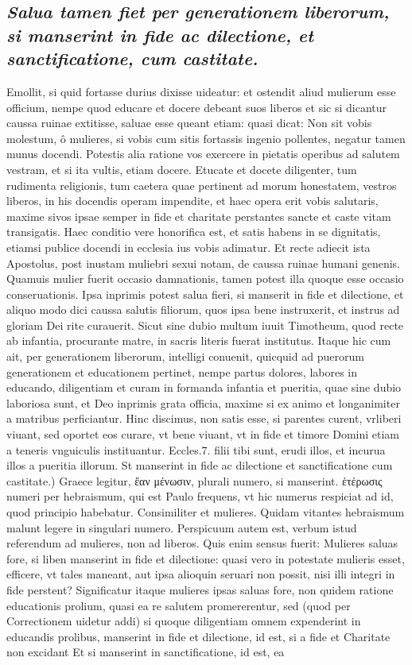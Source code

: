 \documentclass{article}
\begin{document}
\begin{pages}
\subsection*{\textit{Salua tamen fiet per generationem liberorum, si manserint in fide ac dilectione, et sanctificatione, cum castitate. }}\pstart Emollit, si quid fortasse durius dixisse uideatur: et ostendit aliud mulierum esse officium, nempe quod educare et docere debeant suos liberos et sic si dicantur caussa ruinae extitisse, saluae esse queant etiam: quasi dicat: Non sit vobis molestum, ô mulieres, si vobis cum sitis fortassis ingenio pollentes, negatur tamen munus docendi. Potestis alia ratione vos exercere in pietatis operibus ad salutem vestram, et si ita vultis, etiam docere. Etucate et docete diligenter, tum rudimenta religionis, tum caetera quae pertinent ad morum honestatem, vestros liberos, in his docendis operam impendite, et haec opera erit vobis salutaris, maxime sivos ipsae semper in fide et charitate perstantes sancte et caste vitam transigatis. Haec conditio vere honorifica est, et satis habens in se dignitatis, etiamsi publice docendi in ecclesia ius vobis adimatur. Et recte adiecit ista Apostolus, post inustam muliebri sexui notam, de caussa ruinae humani genenis. Quamuis mulier fuerit occasio damnationis, tamen potest illa quoque  esse occasio conseruationis. Ipsa inprimis potest salua fieri, si manserit in fide et dilectione, et aliquo modo dici caussa salutis filiorum, quos ipsa bene instruxerit, et instrus ad gloriam Dei rite curauerit. Sicut sine dubio multum iuuit Timotheum, quod recte ab infantia, procurante matre, in sacris literis fuerat institutus. Itaque hic cum ait, per generationem liberorum, intelligi conuenit, quicquid ad puerorum generationem et educationem pertinet, nempe partus dolores, labores in educando, diligentiam et curam in formanda infantia et pueritia, quae sine dubio laboriosa sunt, et Deo inprimis grata officia, maxime si ex animo et longanimiter a matribus perficiantur. Hinc discimus, non satis esse, si parentes curent, vrliberi viuant, sed oportet eos curare, vt bene viuant, vt in fide et timore Domini etiam a teneris vnguiculis instituantur. Eccles.7. filii tibi sunt, erudi illos, et incurua illos a pueritia illorum.  \pend\pstart St manserint in fide ac dilectione et sanctificatione cum castitate.) Graece legitur, ἔαν μένωσιν, plurali numero, si manserint. ἑτέρωσις numeri per hebraismum, qui est Paulo frequens, vt hic numerus respiciat ad id, quod principio habebatur. Consimiliter et mulieres. Quidam vitantes hebraismum malunt legere in singulari numero. Perspicuum autem est, verbum istud referendum ad mulieres, non ad liberos. Quis enim sensus fuerit: Mulieres saluas fore, si liben manserint in fide et dilectione: quasi vero in potestate mulieris esset, efficere, vt tales maneant, aut ipsa alioquin seruari non possit, nisi illi integri in fide perstent? Significatur itaque mulieres ipsas saluas fore, non quidem ratione educationis prolium, quasi ea re salutem promererentur, sed (quod per Correctionem uidetur addi) si quoque  diligentiam omnem expenderint in educandis prolibus, manserint in fide et dilectione, id est, si a fide et Charitate non excidant Et si manserint in sanctificatione, id est, ea 
\end{pages}
\end{document}
